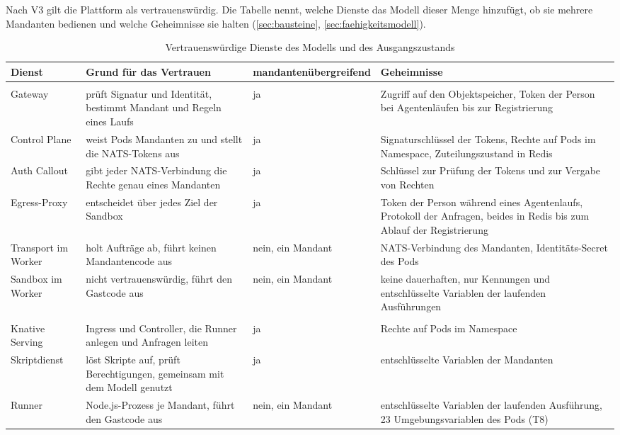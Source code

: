 Nach V3 gilt die Plattform als vertrauenswürdig. Die Tabelle nennt, welche Dienste das Modell dieser Menge hinzufügt,
ob sie mehrere Mandanten bedienen und welche Geheimnisse sie halten (\autoref{sec:bausteine},
\autoref{sec:faehigkeitsmodell}).

\begin{table}[H]
  \caption{Vertrauenswürdige Dienste des Modells und des Ausgangszustands}
  \label{tab:tcb}
  \footnotesize
  \begin{tabularx}{\textwidth}{@{}>{\RaggedRight\arraybackslash}p{} >{\RaggedRight\arraybackslash}X >{\RaggedRight\arraybackslash}p{} >{\RaggedRight\arraybackslash}p{}@{}}
    \hline
    Dienst & Grund für das Vertrauen & mandanten\-übergreifend & Geheimnisse \\
    \hline
    \multicolumn{4}{@{}l}{\emph{Modell}} \\
    Gateway & prüft Signatur und Identität, bestimmt Mandant und Regeln eines Laufs & ja & Zugriff auf den Objektspeicher,
      Token der Person bei Agentenläufen bis zur Registrierung \\
    Control Plane & weist Pods Mandanten zu und stellt die NATS-Tokens aus & ja & Signaturschlüssel der Tokens, Rechte auf
      Pods im Namespace, Zuteilungszustand in Redis \\
    Auth Callout & gibt jeder NATS-Verbindung die Rechte genau eines Mandanten & ja & Schlüssel zur Prüfung der Tokens und
      zur Vergabe von Rechten \\
    Egress-Proxy & entscheidet über jedes Ziel der Sandbox & ja & Token der Person während eines Agentenlaufs, Protokoll
      der Anfragen, beides in Redis bis zum Ablauf der Registrierung \\
    Transport im Worker & holt Aufträge ab, führt keinen Mandantencode aus & nein, ein Mandant & NATS-Verbindung des
      Mandanten, Identitäts-Secret des Pods \\
    Sandbox im Worker & nicht vertrauenswürdig, führt den Gastcode aus & nein, ein Mandant & keine dauerhaften, nur Kennungen und entschlüsselte Variablen der laufenden Ausführungen \\
    \multicolumn{4}{@{}l}{\emph{Ausgangszustand}} \\
    Knative Serving & Ingress und Controller, die Runner anlegen und Anfragen leiten & ja & Rechte auf Pods im
      Namespace \\
    Skriptdienst & löst Skripte auf, prüft Berechtigungen, gemeinsam mit dem Modell genutzt & ja & entschlüsselte
      Variablen der Mandanten \\
    Runner & Node.js-Prozess je Mandant, führt den Gastcode aus & nein, ein Mandant & entschlüsselte Variablen der laufenden Ausführung, 23 Umgebungsvariablen
      des Pods (T8) \\
    \hline
  \end{tabularx}
\end{table}

